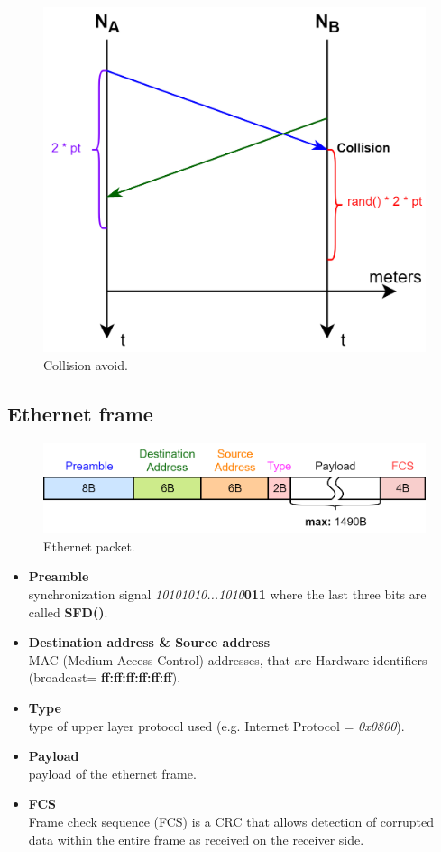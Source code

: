 \begin{figure}[H]
\centering
\includegraphics[scale=0.3]{Images/Layer2/collision_avoid}
\caption{\footnotesize{Collision avoid.}}\label{collision_avoid}
\end{figure}

\subsection{Ethernet frame}
\begin{figure}[H]
\centering
\includegraphics[scale=0.3]{Images/Layer2/layer2_message}
\caption{\footnotesize{Ethernet packet.}}\label{layer2_message}
\end{figure}
\begin{itemize}
\item{\textbf{Preamble}\\
synchronization signal \textit{10101010...1010}\textbf{011} where the last three bits are called \textbf{SFD()}.
}
\item{\textbf{Destination address \& Source address}\\
MAC (Medium Access Control) addresses, that are Hardware identifiers (broadcast= \textbf{ff:ff:ff:ff:ff:ff}).  
}
\item{\textbf{Type}\\
type of upper layer protocol used (e.g. Internet Protocol = \textit{0x0800})\cite{frame_type}.
}
\item{\textbf{Payload}\\
payload of the ethernet frame.
}
\item{\textbf{FCS}\\
Frame check sequence (FCS) is a CRC that allows detection of corrupted data within the entire frame as received on the receiver side.
}
\end{itemize}

